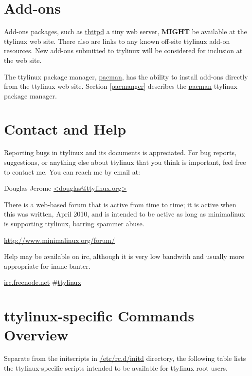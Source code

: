 \documentclass[10pt]{article}
\begin{document}
\newpage
\section{Add-ons}

Add-ons packages, such as \url{thttpd} a tiny web server, {\bf MIGHT} be
available at the ttylinux web site. There also are links to any known off-site
ttylinux add-on resources. New add-ons submitted to ttylinux will be considered
for inclusion at the web site.

The ttylinux package manager, \url{pacman}, has the ability to install add-ons
directly from the ttylinux web site. Section \ref{pacmanger} describes the
\url{pacman} ttylinux package manager.

\newpage
\section{Contact and Help}

Reporting bugs in ttylinux and its documents is appreciated. For bug reports,
suggestions, or anything else about ttylinux that you think is important, feel
free to contact me. You can reach me by email at:

\hspace{0.5in}Douglas Jerome \url{<douglas@ttylinux.org>}

There is a web-based forum that is active from time to time; it is active when
this was written, April 2010, and is intended to be active as long as
minimalinux is supporting ttylinux, barring spammer abuse.

\hspace{0.5in}\url{http://www.minimalinux.org/forum/}

Help may be available on irc, although it is very low bandwith and usually more
appropriate for inane banter.

\hspace{0.5in}\url{irc.freenode.net} \#\url{ttylinux}

\appendix

\newpage
\section{ttylinux-specific Commands Overview}

Separate from the initscripts in \url{/etc/rc.d/initd} directory, the
following table lists the ttylinux-specific scripts intended to be available
for ttylinux root users.
\end{document}
